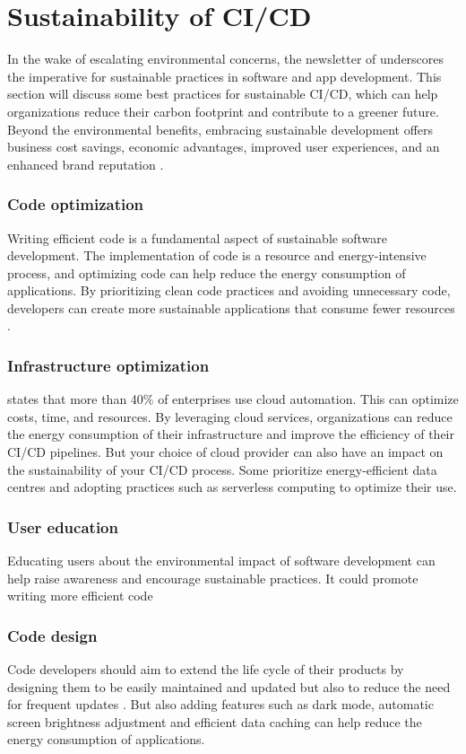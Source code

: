 \section{Sustainability of CI/CD}
In the wake of escalating environmental concerns, the newsletter of \textcite{Corewave2023} underscores the imperative for sustainable practices in software and app development.
This section will discuss some best practices for sustainable CI/CD, which can help organizations reduce their carbon footprint and contribute to a greener future.
Beyond the environmental benefits, embracing sustainable development offers business cost savings, economic advantages, improved user experiences, and an enhanced brand reputation \autocite{Corewave2023}.

\subsubsection{Code optimization}
Writing efficient code is a fundamental aspect of sustainable software development. 
The implementation of code is a resource and energy-intensive process, and optimizing code can help reduce the energy consumption of applications.
By prioritizing clean code practices and avoiding unnecessary code, developers can create more sustainable applications that consume fewer resources \autocite{Corewave2023}.

\subsubsection{Infrastructure optimization} 
\textcite{Krivec2023} states that more than 40\% of enterprises use cloud automation. This can optimize costs, time, and resources.
By leveraging cloud services, organizations can reduce the energy consumption of their infrastructure and improve the efficiency of their CI/CD pipelines.
But your choice of cloud provider can also have an impact on the sustainability of your CI/CD process. 
Some prioritize energy-efficient data centres and adopting practices such as serverless computing to optimize their use.

\subsubsection{User education}
Educating users about the environmental impact of software development can help raise awareness and encourage sustainable practices.
It could promote writing more efficient code

\subsubsection{Code design}
Code developers should aim to extend the life cycle of their products by designing them to be easily maintained and updated but also to reduce the need for frequent updates \autocite{Zudu2024}.
But also adding features such as dark mode, automatic screen brightness adjustment and efficient data caching can help reduce the energy consumption of applications.

